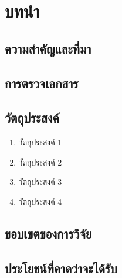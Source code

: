 \documentclass[thesis.tex]{subfiles}
\begin{document}
\chapter{บทนำ}
\section{ความสำคัญและที่มา}
\section{การตรวจเอกสาร}
\section{วัตถุประสงค์}
\begin{enumerate}[label=\thesection.\arabic*, leftmargin=1.5cm]
	\item วัตถุประสงค์ 1
	\item วัตถุประสงค์ 2
	\item วัตถุประสงค์ 3
	\item วัตถุประสงค์ 4
\end{enumerate}
\section{ขอบเขตของการวิจัย}
\section{ประโยชน์ที่คาดว่าจะได้รับ}
\end{document}
